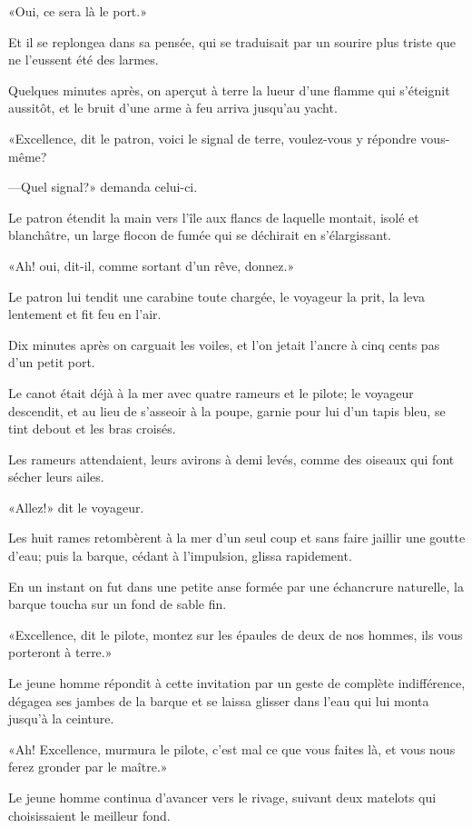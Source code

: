 «Oui, ce sera là le port.» 

Et il se replongea dans sa pensée, qui se traduisait par un sourire plus triste que ne l'eussent été des larmes. 

Quelques minutes après, on aperçut à terre la lueur d'une flamme qui s'éteignit aussitôt, et le bruit d'une arme à feu arriva jusqu'au yacht. 

«Excellence, dit le patron, voici le signal de terre, voulez-vous y répondre vous-même? 

—Quel signal?» demanda celui-ci. 

Le patron étendit la main vers l'île aux flancs de laquelle montait, isolé et blanchâtre, un large flocon de fumée qui se déchirait en s'élargissant. 

«Ah! oui, dit-il, comme sortant d'un rêve, donnez.» 

Le patron lui tendit une carabine toute chargée, le voyageur la prit, la leva lentement et fit feu en l'air. 

Dix minutes après on carguait les voiles, et l'on jetait l'ancre à cinq cents pas d'un petit port. 

Le canot était déjà à la mer avec quatre rameurs et le pilote; le voyageur descendit, et au lieu de s'asseoir à la poupe, garnie pour lui d'un tapis bleu, se tint debout et les bras croisés. 

Les rameurs attendaient, leurs avirons à demi levés, comme des oiseaux qui font sécher leurs ailes. 

«Allez!» dit le voyageur. 

Les huit rames retombèrent à la mer d'un seul coup et sans faire jaillir une goutte d'eau; puis la barque, cédant à l'impulsion, glissa rapidement. 

En un instant on fut dans une petite anse formée par une échancrure naturelle, la barque toucha sur un fond de sable fin. 

«Excellence, dit le pilote, montez sur les épaules de deux de nos hommes, ils vous porteront à terre.» 

Le jeune homme répondit à cette invitation par un geste de complète indifférence, dégagea ses jambes de la barque et se laissa glisser dans l'eau qui lui monta jusqu'à la ceinture. 

«Ah! Excellence, murmura le pilote, c'est mal ce que vous faites là, et vous nous ferez gronder par le maître.» 

Le jeune homme continua d'avancer vers le rivage, suivant deux matelots qui choisissaient le meilleur fond. 

